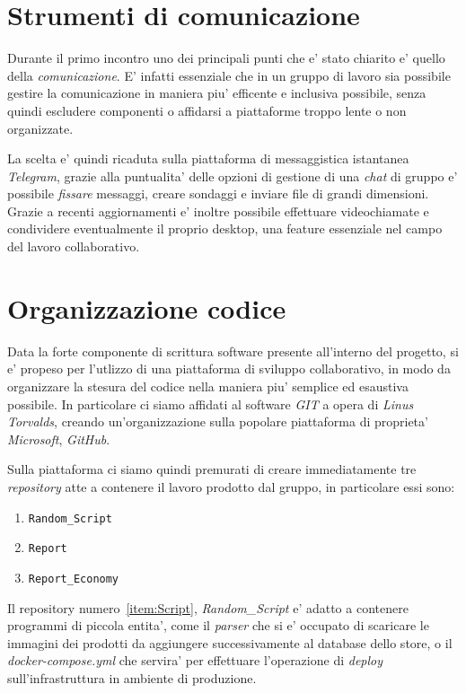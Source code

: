 \documentclass[a4paper]{report}
\begin{document}
	\section{Strumenti di comunicazione}\label{strumenti di comunicazione}
		Durante il primo incontro uno dei principali punti che e' stato chiarito e' quello della \emph{comunicazione}.
		E' infatti essenziale che in un gruppo di lavoro sia possibile gestire la comunicazione in maniera piu'
		efficente e inclusiva possibile, senza quindi escludere componenti o affidarsi a piattaforme troppo lente o non
		organizzate.
		
		La scelta e' quindi ricaduta sulla piattaforma di messaggistica istantanea \emph{Telegram}, grazie alla
		puntualita' delle opzioni di gestione di una \emph{chat} di gruppo e' possibile \emph{fissare} messaggi, creare
		sondaggi e inviare file di grandi dimensioni. Grazie a recenti aggiornamenti e' inoltre possibile effettuare
		videochiamate e condividere eventualmente il proprio desktop, una feature essenziale nel campo del lavoro
		collaborativo.
	\section{Organizzazione codice}\label{organizzazione codice}
		Data la forte componente di scrittura software presente all'interno del progetto, si e' propeso per l'utlizzo
		di una piattaforma di sviluppo collaborativo, in modo da organizzare la stesura del codice nella maniera piu'
		semplice ed esaustiva possibile. In particolare ci siamo affidati al software \emph{GIT} a opera di \emph{Linus
		Torvalds}, creando un'organizzazione sulla popolare piattaforma di proprieta' \emph{Microsoft}, \emph{GitHub}.

		Sulla piattaforma ci siamo quindi premurati di creare immediatamente tre \emph{repository} atte a contenere il
		lavoro prodotto dal gruppo, in particolare essi sono:
		\begin{enumerate}
			\item \texttt{Random\_Script}\label{item:Script}
			\item \texttt{Report}\label{item:Report}
			\item \texttt{Report\_Economy}\label{item:ReportE}
		\end{enumerate}

		Il repository numero~\ref{item:Script}{, \emph{Random\_Script}} e' adatto a contenere programmi di piccola
		entita', come il \emph{parser} che si e' occupato di scaricare le immagini dei prodotti da aggiungere
		successivamente al database dello store, o il \emph{docker-compose.yml} che servira' per effettuare l'operazione
		di \emph{deploy} sull'infrastruttura in ambiente di produzione.
\end{document}
